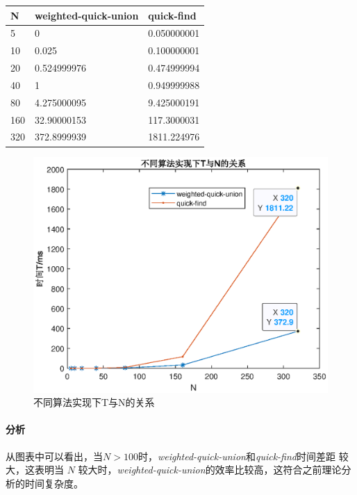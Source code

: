 \documentclass[12pt,a4paper]{ctexart}
\begin{document}
\begin{table}[htbp]
    \centering
    \begin{tabular}{|l|l|l|}

    \hline
    N   & weighted-quick-union & quick-find  \\ \hline
    5   & 0                    & 0.050000001 \\ \hline
    10  & 0.025                & 0.100000001 \\ \hline
    20  & 0.524999976          & 0.474999994 \\ \hline
    40  & 1                    & 0.949999988 \\ \hline
    80  & 4.275000095          & 9.425000191 \\ \hline
    160 & 32.90000153          & 117.3000031 \\ \hline
    320 & 372.8999939          & 1811.224976 \\ \hline
    \end{tabular}
    \end{table}

\begin{figure}[H]
    \centering
    \includegraphics{percolation.eps}
    \caption{不同算法实现下T与N的关系}
\end{figure}

\paragraph{分析}从图表中可以看出，当$N>100$时，\textit{weighted-quick-union}和\textit{quick-find}时间差距
较大，这表明当 $N$ 较大时，\textit{weighted-quick-union}的效率比较高，这符合之前理论分析的时间复杂度。
\end{document}
